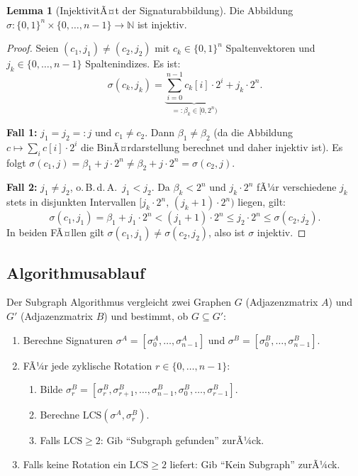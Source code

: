﻿\documentclass[a4paper,12pt]{article}
\theoremstyle{definition}
\newtheorem{lemma}{Lemma}
\begin{document}
\begin{lemma}[InjektivitÃ¤t der Signaturabbildung]
\label{lem:injektiv}
Die Abbildung $\sigma: \{0,1\}^n \times \{0,\ldots,n-1\} \to \mathbb{N}$ ist
injektiv.
\end{lemma}

\begin{proof}
Seien $(c_1, j_1) \neq (c_2, j_2)$ mit $c_k \in \{0,1\}^n$ Spaltenvektoren und
$j_k \in \{0,\ldots,n-1\}$ Spaltenindizes. Es ist:
\[
  \sigma(c_k, j_k) = \underbrace{\sum_{i=0}^{n-1} c_k[i] \cdot 2^i}_{=: \beta_k \in [0, 2^n)}
                   + j_k \cdot 2^n.
\]

\textbf{Fall 1:} $j_1 = j_2 =: j$ und $c_1 \neq c_2$.
Dann $\beta_1 \neq \beta_2$ (da die Abbildung $c \mapsto \sum_i c[i] \cdot 2^i$ die
BinÃ¤rdarstellung berechnet und daher injektiv ist). Es folgt
$\sigma(c_1,j) = \beta_1 + j \cdot 2^n \neq \beta_2 + j \cdot 2^n = \sigma(c_2,j)$.

\textbf{Fall 2:} $j_1 \neq j_2$, o.\,B.\,d.\,A.\ $j_1 < j_2$.
Da $\beta_k < 2^n$ und $j_k \cdot 2^n$ fÃ¼r verschiedene $j_k$ stets in disjunkten
Intervallen $[j_k \cdot 2^n,\, (j_k+1) \cdot 2^n)$ liegen, gilt:
\[
  \sigma(c_1,j_1) = \beta_1 + j_1 \cdot 2^n < (j_1+1)\cdot 2^n
    \leq j_2 \cdot 2^n \leq \sigma(c_2,j_2).
\]
In beiden FÃ¤llen gilt $\sigma(c_1,j_1) \neq \sigma(c_2,j_2)$, also ist
$\sigma$ injektiv.
\end{proof}

\subsection{Algorithmusablauf}

Der Subgraph Algorithmus vergleicht zwei Graphen $G$ (Adjazenzmatrix $A$) und $G'$
(Adjazenzmatrix $B$) und bestimmt, ob $G \subseteq G'$:

\begin{enumerate}
  \item Berechne Signaturen $\sigma^A = [\sigma_0^A, \ldots, \sigma_{n-1}^A]$ und
        $\sigma^B = [\sigma_0^B, \ldots, \sigma_{n-1}^B]$.
  \item FÃ¼r jede zyklische Rotation $r \in \{0,\ldots,n-1\}$:
    \begin{enumerate}
      \item Bilde $\sigma^B_r = [\sigma_r^B, \sigma_{r+1}^B, \ldots,
            \sigma_{n-1}^B, \sigma_0^B, \ldots, \sigma_{r-1}^B]$.
      \item Berechne $\mathrm{LCS}(\sigma^A, \sigma^B_r)$.
      \item Falls $\mathrm{LCS} \geq 2$: Gib ``Subgraph gefunden'' zurÃ¼ck.
    \end{enumerate}
  \item Falls keine Rotation ein $\mathrm{LCS} \geq 2$ liefert: Gib ``Kein Subgraph''
        zurÃ¼ck.
\end{enumerate}
\end{document}
